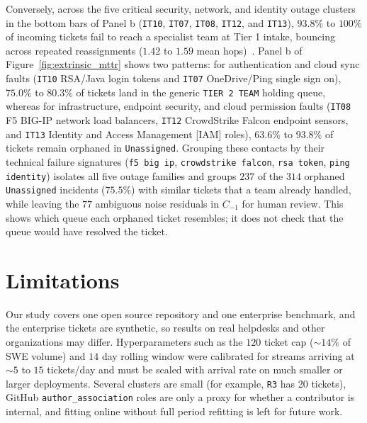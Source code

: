 \documentclass[sigconf,nonacm,pbalance]{acmart}
\begin{document}
Conversely, across the five critical security, network, and identity outage clusters in the bottom bars of Panel b (\texttt{IT10}, \texttt{IT07}, \texttt{IT08}, \texttt{IT12}, and \texttt{IT13}), $93.8\%$ to $100\%$ of incoming tickets fail to reach a specialist team at Tier 1 intake, bouncing across repeated reassignments ($1.42$ to $1.59$ mean hops)~\cite{agarwal2012identifying, chen2020incidental}. Panel b of Figure~\ref{fig:extrinsic_mttr} shows two patterns: for authentication and cloud sync faults (\texttt{IT10} RSA/Java login tokens and \texttt{IT07} OneDrive/Ping single sign on), $75.0\%$ to $80.3\%$ of tickets land in the generic \texttt{TIER 2 TEAM} holding queue, whereas for infrastructure, endpoint security, and cloud permission faults (\texttt{IT08} F5 BIG-IP network load balancers, \texttt{IT12} CrowdStrike Falcon endpoint sensors, and \texttt{IT13} Identity and Access Management [IAM] roles), $63.6\%$ to $93.8\%$ of tickets remain orphaned in \texttt{Unassigned}. Grouping these contacts by their technical failure signatures (\texttt{f5 big ip}, \texttt{crowdstrike falcon}, \texttt{rsa token}, \texttt{ping identity}) isolates all five outage families and groups $237$ of the $314$ orphaned \texttt{Unassigned} incidents ($75.5\%$) with similar tickets that a team already handled, while leaving the $77$ ambiguous noise residuals in $C_{-1}$ for human review. This shows which queue each orphaned ticket resembles; it does not check that the queue would have resolved the ticket.

\section{Limitations}
Our study covers one open source repository and one enterprise benchmark, and the enterprise tickets are synthetic, so results on real helpdesks and other organizations may differ. Hyperparameters such as the $120$ ticket cap ($\sim\!14\%$ of SWE volume) and $14$ day rolling window were calibrated for streams arriving at $\sim\!5$ to $15$ tickets/day and must be scaled with arrival rate on much smaller or larger deployments. Several clusters are small (for example, \texttt{R3} has 20 tickets), GitHub \texttt{author\_association} roles are only a proxy for whether a contributor is internal, and fitting online without full period refitting is left for future work.
\end{document}
